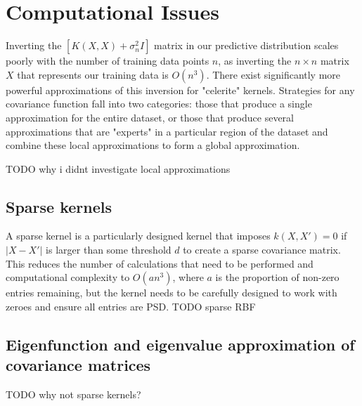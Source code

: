 \section{Computational Issues}

Inverting the $[K(X,X) + \sigma^2_nI]$ matrix in our predictive distribution scales poorly with the number of training data points $n$, as inverting the $n \times n$ matrix $X$ that represents our training data is $O(n^3)$. There exist significantly more powerful approximations of this inversion for "celerite" kernels. Strategies for any covariance function fall into two categories: those that produce a single approximation for the entire dataset, or those that produce several approximations that are "experts" in a particular region of the dataset and combine these local approximations to form a global approximation.

TODO why i didnt investigate local approximations 



\subsection{Sparse kernels \cite{big-data}}
A sparse kernel is a particularly designed kernel that imposes $k(X,X') = 0$ if $|X - X'|$ is larger than some threshold $d$ to create a sparse covariance matrix. This reduces the number of calculations that need to be performed and computational complexity to $O(an^3)$, where $a$ is the proportion of non-zero entries remaining, but the kernel needs to be carefully designed to work with zeroes and ensure all entries are PSD. TODO sparse RBF

\subsection{Eigenfunction and eigenvalue approximation of covariance matrices \cite{gp-ml}}
TODO why not sparse kernels?

